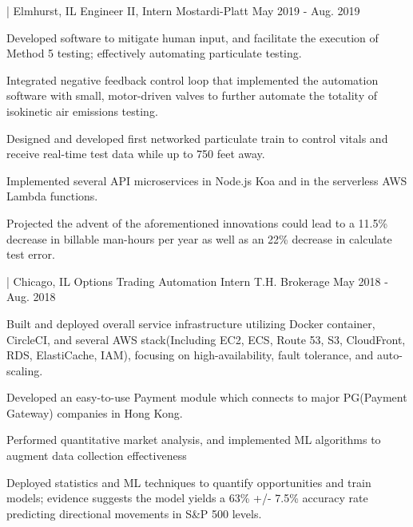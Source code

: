 

\begin{cventries}

  \cventry
     { | Elmhurst, IL} %
    {Engineer II, Intern} %
    {Mostardi-Platt} %
    {May 2019 - Aug. 2019} %
    {
      \begin{cvitems} %
        \item {Developed software to mitigate human input, and facilitate the execution of Method 5 testing; effectively automating particulate testing.}
        \item {Integrated negative feedback control loop that implemented the automation software with small, motor-driven valves to further automate the totality of isokinetic air emissions testing.}
        \item {Designed and developed first networked particulate train to control vitals and receive real-time test data while up to 750 feet away.}
        \item {Implemented several API microservices in Node.js Koa and in the serverless AWS Lambda functions.}
        \item {Projected the advent of the aforementioned innovations could lead to a 11.5\% decrease in billable man-hours per year as well as an 22\% decrease in calculate test error.}
      \end{cvitems}
    }

  \cventry
     { | Chicago, IL} %
    {Options Trading Automation Intern} %
    {T.H. Brokerage} %
    {May 2018 - Aug. 2018} %
    {
      \begin{cvitems} %
        \item {Built and deployed overall service infrastructure utilizing Docker container, CircleCI, and several AWS stack(Including EC2, ECS, Route 53, S3, CloudFront, RDS, ElastiCache, IAM), focusing on high-availability, fault tolerance, and auto-scaling.}
        \item {Developed an easy-to-use Payment module which connects to major PG(Payment Gateway) companies in Hong Kong.}
        \item {Performed quantitative market analysis, and implemented ML algorithms to augment data collection effectiveness}
        \item {Deployed statistics and ML techniques to quantify opportunities and train models; evidence suggests the model yields a 63\% +/- 7.5\% accuracy rate predicting directional movements in S\&P 500 levels.}
      \end{cvitems}
    }

 
\end{cventries}
